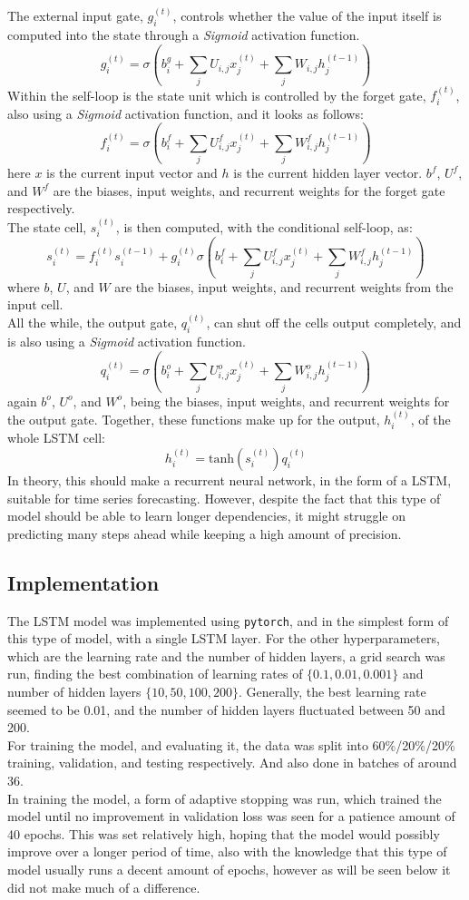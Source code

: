 \documentclass[main.tex]{subfiles}
\begin{document}
The external input gate, $g_i^{(t)}$, controls whether the value of the input itself is computed into the state through a \textit{Sigmoid} activation function. 
$$g_i^{(t)} = \sigma (b_i^g + \sum_j U_{i,j}x_j^{(t)} + \sum_j W_{i,j}h_j^{(t-1)})$$
Within the self-loop is the state unit which is controlled by the forget gate, $f_i^{(t)}$, also using a \textit{Sigmoid} activation function, and it looks as follows:
$$f_i^{(t)} = \sigma (b_i^f + \sum_j U^f_{i,j}x_j^{(t)} + \sum_j W^f_{i,j}h_j^{(t-1)})$$
here \textit{$x$} is the current input vector and \textit{$h$} is the current hidden layer vector. $b^f$, $U^f$, and $W^f$ are the biases, input weights, and recurrent weights for the forget gate respectively.\\
The state cell, $s_i^{(t)}$, is then computed, with the conditional self-loop, as:
$$s_i^{(t)} = f_i^{(t)}s_i^{(t-1)} + g_i^{(t)} \sigma (b_i^f + \sum_j U^f_{i,j}x_j^{(t)} + \sum_j W^f_{i,j}h_j^{(t-1)})$$
where \textit{$b$}, \textit{$U$}, and \textit{$W$} are the biases, input weights, and recurrent weights from the input cell.\\
All the while, the output gate, $q_i^{(t)}$, can shut off the cells output completely, and is also using a \textit{Sigmoid} activation function.
$$q_i^{(t)} =  \sigma (b_i^o + \sum_j U^o_{i,j}x_j^{(t)} + \sum_j W^o_{i,j}h_j^{(t-1)})$$
again $b^o$, $U^o$, and $W^o$, being the biases, input weights, and recurrent weights for the output gate.
Together, these functions make up for the output, $h_i^{(t)}$, of the whole LSTM cell:
$$h_i^{(t)} = \text{tanh}(s_i^{(t)})q_i^{(t)}$$
In theory, this should make a recurrent neural network, in the form of a LSTM, suitable for time series forecasting. However, despite the fact that this type of model should be able to learn longer dependencies, it might struggle on predicting many steps ahead while keeping a high amount of precision.

\subsection{Implementation}
The LSTM model was implemented using \texttt{pytorch}, and in the simplest form of this type of model, with a single LSTM layer. For the other hyperparameters, which are the learning rate and the number of hidden layers, a grid search was run, finding the best combination of learning rates of $\{0.1,0.01,0.001\}$ and number of hidden layers $\{10,50,100,200\}$. Generally, the best learning rate seemed to be 0.01, and the number of hidden layers fluctuated between 50 and 200.
\\
For training the model, and evaluating it, the data was split into 60\%/20\%/20\% training, validation, and testing respectively. And also done in batches of around 36.\\
In training the model, a form of adaptive stopping was run, which trained the model until no improvement in validation loss was seen for a patience amount of 40 epochs. This was set relatively high, hoping that the model would possibly improve over a longer period of time, also with the knowledge that this type of model usually runs a decent amount of epochs, however as will be seen below it did not make much of a difference.
\end{document}
